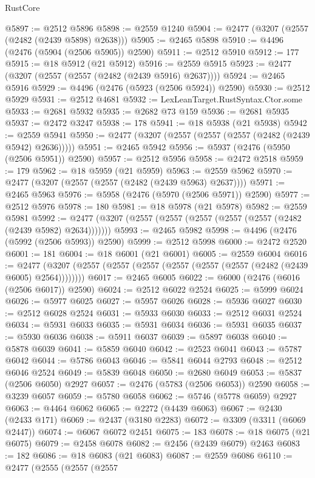 \begin{lexlean}{RustCore}
\begin{coremodule}
@5897 := @2512 @5896
@5898 := @2559 @1240
@5904 := @2477 (@3207 (@2557 (@2482 (@2439 @5898) @2638)))
@5905 := @2465 @5898
@5910 := @4496 (@2476 (@5904 (@2506 @5905)) @2590)
@5911 := @2512 @5910
@5912 := 177
@5915 := @18 @5912 (@21 @5912)
@5916 := @2559 @5915
@5923 := @2477 (@3207 (@2557 (@2557 (@2482 (@2439 @5916) @2637))))
@5924 := @2465 @5916
@5929 := @4496 (@2476 (@5923 (@2506 @5924)) @2590)
@5930 := @2512 @5929
@5931 := @2512 @4681
@5932 := LexLeanTarget.RustSyntax.Ctor.some
@5933 := @2681 @5932
@5935 := @2682 @73 @159
@5936 := @2681 @5935
@5937 := @2472 @3247
@5938 := 178
@5941 := @18 @5938 (@21 @5938)
@5942 := @2559 @5941
@5950 := @2477 (@3207 (@2557 (@2557 (@2557 (@2482 (@2439 @5942) @2636)))))
@5951 := @2465 @5942
@5956 := @5937 (@2476 (@5950 (@2506 @5951)) @2590)
@5957 := @2512 @5956
@5958 := @2472 @2518
@5959 := 179
@5962 := @18 @5959 (@21 @5959)
@5963 := @2559 @5962
@5970 := @2477 (@3207 (@2557 (@2557 (@2482 (@2439 @5963) @2637))))
@5971 := @2465 @5963
@5976 := @5958 (@2476 (@5970 (@2506 @5971)) @2590)
@5977 := @2512 @5976
@5978 := 180
@5981 := @18 @5978 (@21 @5978)
@5982 := @2559 @5981
@5992 := @2477 (@3207 (@2557 (@2557 (@2557 (@2557 (@2557 (@2482 (@2439 @5982) @2634)))))))
@5993 := @2465 @5982
@5998 := @4496 (@2476 (@5992 (@2506 @5993)) @2590)
@5999 := @2512 @5998
@6000 := @2472 @2520
@6001 := 181
@6004 := @18 @6001 (@21 @6001)
@6005 := @2559 @6004
@6016 := @2477 (@3207 (@2557 (@2557 (@2557 (@2557 (@2557 (@2557 (@2482 (@2439 @6005) @2564))))))))
@6017 := @2465 @6005
@6022 := @6000 (@2476 (@6016 (@2506 @6017)) @2590)
@6024 := @2512 @6022 @2524
@6025 := @5999 @6024
@6026 := @5977 @6025
@6027 := @5957 @6026
@6028 := @5936 @6027
@6030 := @2512 @6028 @2524
@6031 := @5933 @6030
@6033 := @2512 @6031 @2524
@6034 := @5931 @6033
@6035 := @5931 @6034
@6036 := @5931 @6035
@6037 := @5930 @6036
@6038 := @5911 @6037
@6039 := @5897 @6038
@6040 := @5878 @6039
@6041 := @5859 @6040
@6042 := @2523 @6041
@6043 := @5787 @6042
@6044 := @5786 @6043
@6046 := @5841 @6044 @2793
@6048 := @2512 @6046 @2524
@6049 := @5839 @6048
@6050 := @2680 @6049
@6053 := @5837 (@2506 @6050) @2927
@6057 := @2476 (@5783 (@2506 @6053)) @2590
@6058 := @3239 @6057
@6059 := @5780 @6058
@6062 := @5746 (@5778 @6059) @2927
@6063 := @4464 @6062
@6065 := @2272 (@4439 @6063)
@6067 := @2430 (@2433 @171)
@6069 := @2437 (@3180 @2283)
@6072 := @3309 (@3311 (@6069 @2447))
@6074 := @6067 @6072 @2451
@6075 := 183
@6078 := @18 @6075 (@21 @6075)
@6079 := @2458 @6078
@6082 := @2456 (@2439 @6079) @2463
@6083 := 182
@6086 := @18 @6083 (@21 @6083)
@6087 := @2559 @6086
@6110 := @2477
    (@2555
      (@2557
        (@2557

\end{coremodule}
\end{lexlean}

